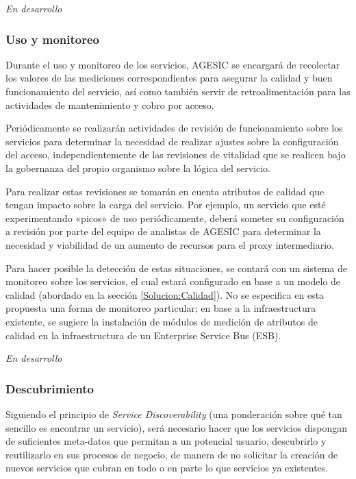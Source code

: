       \emph{En desarrollo}

    \subsubsection{Uso y monitoreo}
      Durante el uso y monitoreo de los servicios, AGESIC se encargará de recolectar los valores de las mediciones correspondientes para asegurar la calidad y buen funcionamiento del servicio, así como también servir de retroalimentación para las actividades de mantenimiento y cobro por acceso.

      Periódicamente se realizarán actividades de revisión de funcionamiento sobre los servicios para determinar la necesidad de realizar ajustes sobre la configuración del acceso, independientemente de las revisiones de vitalidad que se realicen bajo la gobernanza del propio organismo sobre la lógica del servicio.

      Para realizar estas revisiones se tomarán en cuenta atributos de calidad que tengan impacto sobre la carga del servicio. Por ejemplo, un servicio que esté experimentando «picos» de uso periódicamente, deberá someter su configuración a revisión por parte del equipo de analistas de AGESIC para determinar la necesidad y viabilidad de un aumento de recursos para el proxy intermediario.

      Para hacer posible la detección de estas situaciones, se contará con un sistema de monitoreo sobre los servicios, el cual estará configurado en base a un modelo de calidad (abordado en la sección \ref{Solucion:Calidad}). No se especifica en esta propuesta una forma de monitoreo particular; en base a la infraestructura existente, se sugiere la instalación de módulos de medición de atributos de calidad en la infraestructura de un Enterprise Service Bus (ESB).

      \emph{En desarrollo}

    \subsubsection{Descubrimiento}
      Siguiendo el principio de \emph{Service Discoverability} (una ponderación sobre qué tan sencillo es encontrar un servicio), será necesario hacer que los servicios dispongan de suficientes meta-datos que permitan a un potencial usuario, descubrirlo y reutilizarlo en sus procesos de negocio, de manera de no solicitar la creación de nuevos servicios que cubran en todo o en parte lo que servicios ya existentes.

